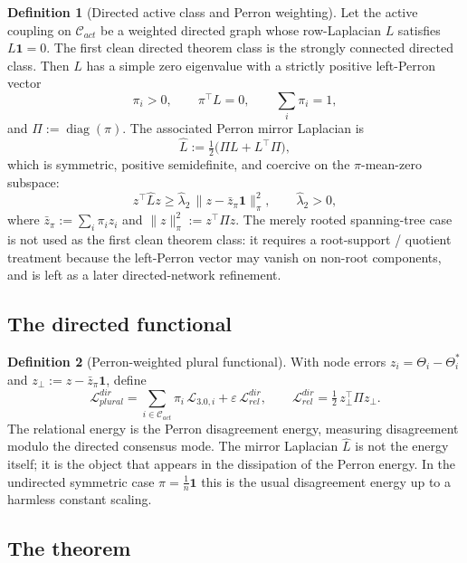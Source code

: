 \documentclass[11pt,a4paper]{article}
\def\mathrm#1{#1}%
\def\emph#1{#1}%
\theoremstyle{definition}
\newtheorem{definition}{Definition}[section]
\theoremstyle{plain}
\theoremstyle{remark}
\begin{document}
\begin{definition}[Directed active class and Perron weighting]\label{def:directed}
Let the active coupling on \(\mathcal C_{\mathrm{act}}\) be a weighted directed graph whose
row-Laplacian \(L\) satisfies \(L\mathbf 1=0\). The first clean directed theorem class is the
\emph{strongly connected} directed class. Then \(L\) has a simple zero eigenvalue with a
strictly positive left-Perron vector
\[
\pi_i>0,
\qquad
\pi^\top L=0,
\qquad
\textstyle\sum_i\pi_i=1,
\]
and \(\Pi:=\operatorname{diag}(\pi)\). The associated \emph{Perron mirror Laplacian} is
\[
\widehat L:=\tfrac12\bigl(\Pi L+L^\top\Pi\bigr),
\]
which is symmetric, positive semidefinite, and coercive on the \(\pi\)-mean-zero subspace:
\[
z^\top\widehat Lz
\ge
\widehat\lambda_2\,\lVert z-\bar z_\pi\mathbf 1\rVert_\pi^2,
\qquad
\widehat\lambda_2>0,
\]
where \(\bar z_\pi:=\sum_i\pi_i z_i\) and \(\lVert z\rVert_\pi^2:=z^\top\Pi z\). The merely
rooted spanning-tree case is not used as the first clean theorem class: it requires a
root-support / quotient treatment because the left-Perron vector may vanish on non-root
components, and is left as a later directed-network refinement.
\end{definition}

\subsection{The directed functional}

\begin{definition}[Perron-weighted plural functional]\label{def:dir-lyap}
With node errors \(z_i=\Theta_i-\Theta_i^*\) and \(z_\perp:=z-\bar z_\pi\mathbf 1\), define
\[
\boxed{\;
\mathcal L_{\mathrm{plural}}^{\mathrm{dir}}
=
\sum_{i\in\mathcal C_{\mathrm{act}}}\pi_i\,\mathcal L_{3.0,i}
+
\varepsilon\,\mathcal L_{\mathrm{rel}}^{\mathrm{dir}},
\qquad
\mathcal L_{\mathrm{rel}}^{\mathrm{dir}}
=
\tfrac12\,z_\perp^\top\Pi z_\perp .
\;}
\]
The relational energy is the Perron disagreement energy, measuring disagreement modulo the
directed consensus mode. The mirror Laplacian \(\widehat L\) is not the energy itself; it is
the object that appears in the dissipation of the Perron energy. In the undirected symmetric
case \(\pi=\tfrac1n\mathbf 1\) this is the usual disagreement energy up to a harmless
constant scaling.
\end{definition}

\subsection{The theorem}
\end{document}
